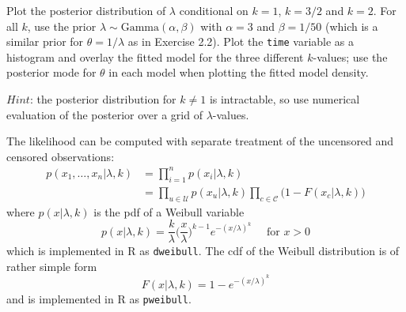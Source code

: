 \documentclass[
  letterpaper,
  DIV=11,
  numbers=noendperiod]{scrartcl}
\begin{document}
Plot the posterior distribution of \(\lambda\) conditional on \(k=1\),
\(k=3/2\) and \(k=2\). For all \(k\), use the prior
\(\lambda \sim \mathrm{Gamma}(\alpha,\beta)\) with \(\alpha=3\) and
\(\beta=1/50\) (which is a similar prior for \(\theta=1/\lambda\) as in
Exercise 2.2). Plot the \texttt{time} variable as a histogram and
overlay the fitted model for the three different \(k\)-values; use the
posterior mode for \(\theta\) in each model when plotting the fitted
model density.

\(\textit{Hint}\): the posterior distribution for \(k\neq 1\) is
intractable, so use numerical evaluation of the posterior over a grid of
\(\lambda\)-values.

\begin{tcolorbox}[enhanced jigsaw, coltitle=black, breakable, colbacktitle=quarto-callout-note-color!10!white, colframe=quarto-callout-note-color-frame, bottomrule=.15mm, toprule=.15mm, rightrule=.15mm, arc=.35mm, colback=white, opacityback=0, bottomtitle=1mm, leftrule=.75mm, title={Solution}, titlerule=0mm, toptitle=1mm, left=2mm, opacitybacktitle=0.6]

The likelihood can be computed with separate treatment of the uncensored
and censored observations: \[
\begin{align}
p(x_1,\ldots,x_n \vert \lambda, k) & = \prod_{i=1}^n p(x_i \vert \lambda, k) \\
& = \prod_{u \in \mathcal{U}} p(x_u \vert \lambda, k) \prod_{c \in \mathcal{C}} \Big(1 - F(x_c \vert \lambda, k)\Big) 
\end{align}
\] where \(p(x \vert \lambda, k)\) is the pdf of a Weibull variable \[
p(x \vert \lambda, k) = \frac{k}{\lambda}\Big( \frac{x}{\lambda} \Big)^{k-1}e^{-(x/\lambda)^k}\quad\text{ for }x>0
\] which is implemented in R as \texttt{dweibull}. The cdf of the
Weibull distribution is of rather simple form \[
F(x \vert \lambda, k) = 1 - e^{-(x/\lambda)^k}
\] and is implemented in R as \texttt{pweibull}.


\end{tcolorbox}
\end{document}
